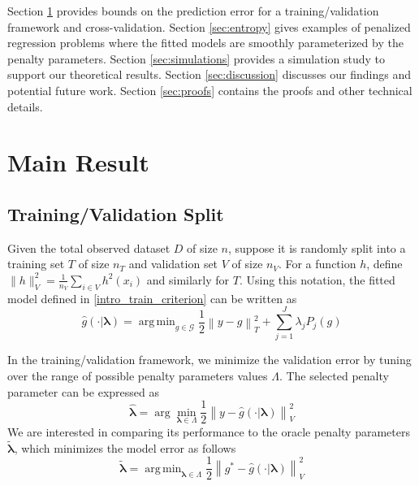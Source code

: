 \documentclass[12pt]{article}
\DeclareMathOperator*{\argmin}{arg\,min}
\begin{document}
Section \ref{sec:main_results} provides bounds on the prediction error for a training/validation framework and cross-validation.
Section \ref{sec:entropy} gives examples of penalized regression problems where the fitted models are smoothly parameterized by the penalty parameters.
Section \ref{sec:simulations} provides a simulation study to support our theoretical results.
Section \ref{sec:discussion} discusses our findings and potential future work.
Section \ref{sec:proofs} contains the proofs and other technical details.

\section{Main Result} \label{sec:main_results}

\subsection{Training/Validation Split}

Given the total observed dataset $D$ of size $n$, suppose it is randomly split into a training set $T$ of size $n_T$ and validation set $V$ of size $n_V$. For a function $h$, define $\| h \|_V^2 = \frac{1}{n_V}\sum_{i\in V} h^2(x_i)$ and similarly for $T$. Using this notation, the fitted model defined in  \eqref{intro_train_criterion} can be written as
\begin{equation}
\hat{g}(\cdot | \boldsymbol \lambda) = \argmin_{g\in \mathcal{G}} \frac{1}{2} \left \|y -  g \right \|_T^2 + \sum_{j=1}^J \lambda_j P_j(g)
\end{equation}

In the training/validation framework, we minimize the validation error by tuning over the range of possible penalty parameters values $\Lambda$. The selected penalty parameter can be expressed as
\begin{equation}
\label{cv_lambda}
\hat{\boldsymbol \lambda} = \arg\min_{\boldsymbol{\lambda} \in\Lambda} \frac{1}{2} \left \| y-\hat{g}(\cdot | \boldsymbol \lambda) \right \|_{V}^{2}
\end{equation}
We are interested in comparing its performance to the oracle penalty parameters $\tilde{\boldsymbol \lambda}$, which minimizes the model error as follows
\begin{equation}
\tilde{\boldsymbol \lambda} = \argmin_{\boldsymbol{\lambda} \in \Lambda} \frac{1}{2} \left \| g^* - \hat{g}(\cdot | \boldsymbol \lambda) \right \|^2_V
\end{equation}
\end{document}
